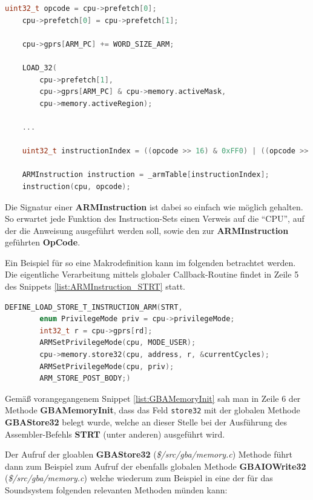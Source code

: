 \documentclass[11pt,a4paper]{scrartcl}
\begin{document}
\vspace{5mm}
\begin{lstlisting}[language=C++, caption={Ausschnitt aus der \textbf{ARMStep}-Methode}, label={list:ARMStep}]
    uint32_t opcode = cpu->prefetch[0];
	cpu->prefetch[0] = cpu->prefetch[1];

	cpu->gprs[ARM_PC] += WORD_SIZE_ARM;
	
	LOAD_32(
	    cpu->prefetch[1],
	    cpu->gprs[ARM_PC] & cpu->memory.activeMask,
	    cpu->memory.activeRegion);

    ...
	
	uint32_t instructionIndex = ((opcode >> 16) & 0xFF0) | ((opcode >> 4) & 0x00F);
	
	ARMInstruction instruction = _armTable[instructionIndex];
	instruction(cpu, opcode);
\end{lstlisting}

Die Signatur einer \textbf{ARMInstruction} ist dabei so einfach wie m\"oglich gehalten. So erwartet jede Funktion des Instruction-Sets einen Verweis auf die \enquote{CPU}, auf der die Anweisung ausgef\"uhrt werden soll, sowie den zur \textbf{ARMInstruction} gef\"uhrten \textbf{OpCode}.

Ein Beispiel f\"ur so eine Makrodefinition kann im folgenden betrachtet werden. Die eigentliche Verarbeitung mittels globaler Callback-Routine findet in Zeile 5 des Snippets \ref{list:ARMInstruction_STRT} statt.

\vspace{5mm}
\begin{lstlisting}[language=C++, caption={ARM Instruction Makro f\"ur \textbf{STRT}}, label={list:ARMInstruction_STRT}]
    DEFINE_LOAD_STORE_T_INSTRUCTION_ARM(STRT,
	    enum PrivilegeMode priv = cpu->privilegeMode;
	    int32_t r = cpu->gprs[rd];
	    ARMSetPrivilegeMode(cpu, MODE_USER);
	    cpu->memory.store32(cpu, address, r, &currentCycles);
	    ARMSetPrivilegeMode(cpu, priv);
	    ARM_STORE_POST_BODY;)
\end{lstlisting}

Gem\"a{\ss} vorangegangenem Snippet \ref{list:GBAMemoryInit} sah man in Zeile 6 der Methode \textbf{GBAMemoryInit}, dass das Feld \verb|store32| mit der globalen Methode \textbf{GBAStore32} belegt wurde, welche an dieser Stelle bei der Ausf\"uhrung des Assembler-Befehls \textbf{STRT} (unter anderen) ausgef\"uhrt wird.

Der Aufruf der gloablen \textbf{GBAStore32} (\textit{\$/src/gba/memory.c}) Methode f\"uhrt dann zum Beispiel zum Aufruf der ebenfalls globalen Methode \textbf{GBAIOWrite32} (\textit{\$/src/gba/memory.c}) welche wiederum zum Beispiel in eine der f\"ur das Soundsystem folgenden relevanten Methoden m\"unden kann:
\end{document}
